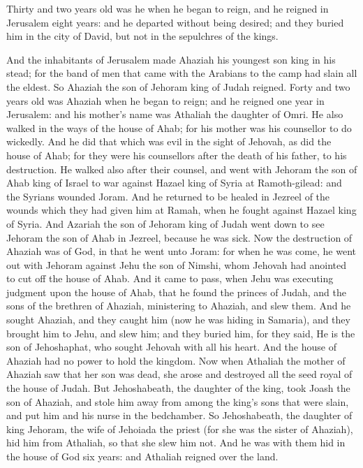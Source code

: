 Thirty and two years old was he when he began to reign, and he reigned in Jerusalem eight years: and he departed without being desired; and they buried him in the city of David, but not in the sepulchres of the kings. 

And the inhabitants of Jerusalem made Ahaziah his youngest son king in his stead; for the band of men that came with the Arabians to the camp had slain all the eldest. So Ahaziah the son of Jehoram king of Judah reigned. Forty and two years old was Ahaziah when he began to reign; and he reigned one year in Jerusalem: and his mother’s name was Athaliah the daughter of Omri. He also walked in the ways of the house of Ahab; for his mother was his counsellor to do wickedly. And he did that which was evil in the sight of Jehovah, as did the house of Ahab; for they were his counsellors after the death of his father, to his destruction. He walked also after their counsel, and went with Jehoram the son of Ahab king of Israel to war against Hazael king of Syria at Ramoth-gilead: and the Syrians wounded Joram. And he returned to be healed in Jezreel of the wounds which they had given him at Ramah, when he fought against Hazael king of Syria. And Azariah the son of Jehoram king of Judah went down to see Jehoram the son of Ahab in Jezreel, because he was sick.  Now the destruction of Ahaziah was of God, in that he went unto Joram: for when he was come, he went out with Jehoram against Jehu the son of Nimshi, whom Jehovah had anointed to cut off the house of Ahab. And it came to pass, when Jehu was executing judgment upon the house of Ahab, that he found the princes of Judah, and the sons of the brethren of Ahaziah, ministering to Ahaziah, and slew them. And he sought Ahaziah, and they caught him (now he was hiding in Samaria), and they brought him to Jehu, and slew him; and they buried him, for they said, He is the son of Jehoshaphat, who sought Jehovah with all his heart. And the house of Ahaziah had no power to hold the kingdom.  Now when Athaliah the mother of Ahaziah saw that her son was dead, she arose and destroyed all the seed royal of the house of Judah. But Jehoshabeath, the daughter of the king, took Joash the son of Ahaziah, and stole him away from among the king’s sons that were slain, and put him and his nurse in the bedchamber. So Jehoshabeath, the daughter of king Jehoram, the wife of Jehoiada the priest (for she was the sister of Ahaziah), hid him from Athaliah, so that she slew him not. And he was with them hid in the house of God six years: and Athaliah reigned over the land. 

